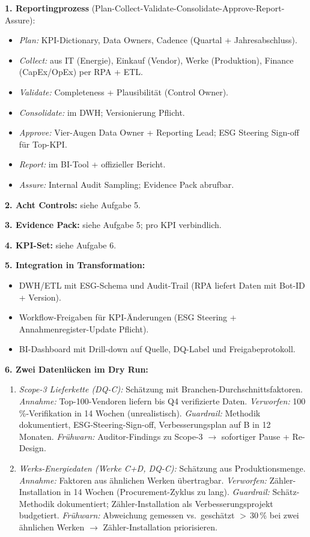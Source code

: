 \documentclass[11pt,a4paper,oneside]{article}
\begin{document}
\begin{loesungbox}
\textbf{1. Reportingprozess} (Plan-Collect-Validate-Consolidate-Approve-Report-Assure):
\begin{itemize}
  \item \emph{Plan:} KPI-Dictionary, Data Owners, Cadence (Quartal + Jahresabschluss).
  \item \emph{Collect:} aus IT (Energie), Einkauf (Vendor), Werke (Produktion), Finance (CapEx/OpEx) \textendash{} per RPA + ETL.
  \item \emph{Validate:} Completeness + Plausibilit\"at (Control Owner).
  \item \emph{Consolidate:} im DWH; Versionierung Pflicht.
  \item \emph{Approve:} Vier-Augen Data Owner + Reporting Lead; ESG Steering Sign-off f\"ur Top-KPI.
  \item \emph{Report:} im BI-Tool + offizieller Bericht.
  \item \emph{Assure:} Internal Audit Sampling; Evidence Pack abrufbar.
\end{itemize}

\smallskip
\textbf{2. Acht Controls:} siehe Aufgabe 5.

\smallskip
\textbf{3. Evidence Pack:} siehe Aufgabe 5; pro KPI verbindlich.

\smallskip
\textbf{4. KPI-Set:} siehe Aufgabe 6.

\smallskip
\textbf{5. Integration in Transformation:}
\begin{itemize}
  \item DWH/ETL mit ESG-Schema und Audit-Trail (RPA liefert Daten mit Bot-ID + Version).
  \item Workflow-Freigaben f\"ur KPI-\"Anderungen (ESG Steering + Annahmenregister-Update Pflicht).
  \item BI-Dashboard mit Drill-down auf Quelle, DQ-Label und Freigabeprotokoll.
\end{itemize}

\smallskip
\textbf{6. Zwei Datenl\"ucken im Dry Run:}
\begin{enumerate}
  \item \emph{Scope-3 Lieferkette (DQ-C):} Sch\"atzung mit Branchen-Durchschnittsfaktoren. \emph{Annahme:} Top-100-Vendoren liefern bis Q4 verifizierte Daten. \emph{Verworfen:} 100\,\%-Verifikation in 14 Wochen (unrealistisch). \emph{Guardrail:} Methodik dokumentiert, ESG-Steering-Sign-off, Verbesserungsplan auf B in 12 Monaten. \emph{Fr\"uhwarn:} Auditor-Findings zu Scope-3 $\rightarrow$ sofortiger Pause + Re-Design.
  \item \emph{Werks-Energiedaten (Werke C+D, DQ-C):} Sch\"atzung aus Produktionsmenge. \emph{Annahme:} Faktoren aus \"ahnlichen Werken \"ubertragbar. \emph{Verworfen:} Z\"ahler-Installation in 14 Wochen (Procurement-Zyklus zu lang). \emph{Guardrail:} Sch\"atz-Methodik dokumentiert; Z\"ahler-Installation als Verbesserungsprojekt budgetiert. \emph{Fr\"uhwarn:} Abweichung gemessen vs.\ gesch\"atzt $>$\,30\,\% bei zwei \"ahnlichen Werken $\rightarrow$ Z\"ahler-Installation priorisieren.
\end{enumerate}
\end{loesungbox}
\end{document}
